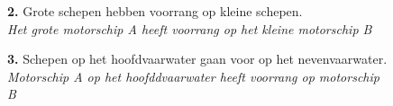 \begin{figure}[H]
	\centering
	\begin{minipage}[t]{0.70\textwidth}
		\textbf{2.} Grote schepen hebben voorrang op kleine schepen.\\
		\textit{Het grote motorschip A heeft voorrang op het kleine motorschip B}
	\end{minipage}
	\hfill
	\begin{minipage}[t]{0.20\textwidth}
		\label{pic:kr2}
	\end{minipage}
	\hfill
\end{figure}

\vspace{-0.7cm}
\begin{figure}[H]
	\centering
	\begin{minipage}[t]{0.72\textwidth}
		\textbf{3.} Schepen op het hoofdvaarwater gaan voor op het nevenvaarwater.\\
		\textit{Motorschip A op het hoofddvaarwater heeft voorrang op motorschip B}
	\end{minipage}
	\hfill
	\begin{minipage}[t]{0.20\textwidth}
		\label{pic:kr3}
	\end{minipage}
	\hfill
\end{figure}

